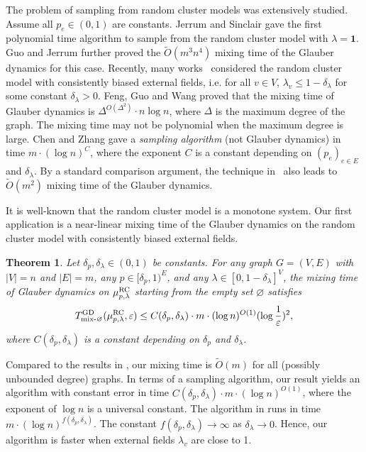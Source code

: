 \documentclass[11pt,a4paper]{article}
\renewcommand{\epsilon}{\varepsilon}
\newtheorem{theorem}{Theorem}[section]
\theoremstyle{definition}
\renewcommand{\emptyset}{\varnothing}
\begin{document}
The problem of sampling from random cluster models was extensively studied. 
Assume all $p_e \in (0,1)$ are constants.
Jerrum and Sinclair \cite{JerrumS93} gave the first polynomial time algorithm to sample from the random cluster model with $\lambda = \bm{1}$. Guo and Jerrum \cite{GJ18} further proved the $\tilde{O}(m^3 n^4)$ mixing time of the Glauber dynamics for this case. Recently, many works~\cite{liu2019ising,feng2023swendsen,CZ23,chen2024spectral} considered the random cluster model with consistently biased external fields, i.e. for all $v \in V$, $\lambda_v \leq 1 - \delta_\lambda$ for some constant $\delta_\lambda > 0$. Feng, Guo and Wang \cite{feng2023swendsen} proved that the mixing time of Glauber dynamics is $\Delta^{O(\Delta^2)} \cdot n \log n$, where $\Delta$ is the maximum degree of the graph. The mixing time may not be polynomial when the maximum degree is large. Chen and Zhang \cite{CZ23} gave a \emph{sampling algorithm} (not Glauber dynamics) in time $ m \cdot (\log n)^{C}$, where the exponent $C$ is a constant depending on $(p_e)_{e \in E}$ and $\delta_\lambda$.
By a standard comparison argument, the technique in~\cite{CZ23} also leads to $\tilde{O}(m^2)$ mixing time of the Glauber dynamics.


It is well-known that the random cluster model is a monotone system.
Our first application is a near-linear mixing time of the Glauber dynamics on the random cluster model with consistently biased external fields.

\begin{theorem}\label{thm:RC-model}
    Let $\delta_p,\delta_\lambda\in (0,1)$ be constants.
    For any graph $G=(V,E)$ with $|V|=n$ and $|E|=m$, any $p\in[\delta_p,1)^E$, and any $\lambda\in [0,1-\delta_\lambda]^V$,
    the mixing time of Glauber dynamics on $\mu_{p,\lambda}^{\textnormal{RC}}$ starting from the empty set $\emptyset$ satisfies 
    \[T^{\textnormal{GD}}_{\textnormal{mix-}\emptyset}(\mu_{p,\lambda}^{\textnormal{RC}},\epsilon)\leq C(\delta_p,\delta_\lambda) \cdot m \cdot (\log n)^{O(1)} (\log \frac{1}{\epsilon})^2,\] 
    where $C(\delta_p,\delta_\lambda)$ is a constant depending on $\delta_p$ and $\delta_\lambda$.
\end{theorem}

Compared to the results in \cite{feng2023swendsen,CZ23}, our mixing time is $\tilde{O}(m)$ for all (possibly unbounded degree) graphs. In terms of a sampling algorithm, our result yields an algorithm with constant error in time $C(\delta_p,\delta_\lambda)\cdot m \cdot (\log n)^{O(1)}$, where the exponent of $\log n$ is a universal constant. The algorithm in \cite{CZ23} runs in time $m \cdot (\log n)^{f(\delta_p,\delta_\lambda)}$. The constant $f(\delta_p,\delta_\lambda) \to \infty$ as $\delta_\lambda \to 0$. Hence, our algorithm is faster when external fields $\lambda_v$ are close to 1.
\end{document}
